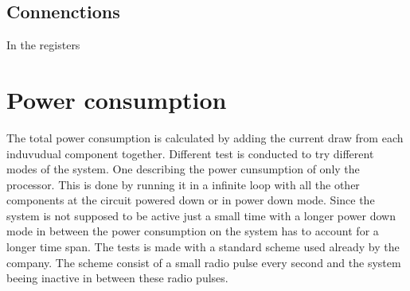 \subsection{Connenctions}
 In the registers 

\section{Power consumption}
 The total power consumption is calculated by adding the current draw from each induvudual component together.  Different test is conducted to try different modes of the system. One describing the power cunsumption of only the processor. This is done by running it in a infinite loop with all the other components at the circuit powered down or in power down mode. Since the system is not supposed to be active just a small time with a longer power down mode in between the power consumption on the system has to account for a longer time span. The tests is made with a standard scheme used already by the company. The scheme consist of a small radio pulse every second and the system beeing inactive in between these radio pulses. 

